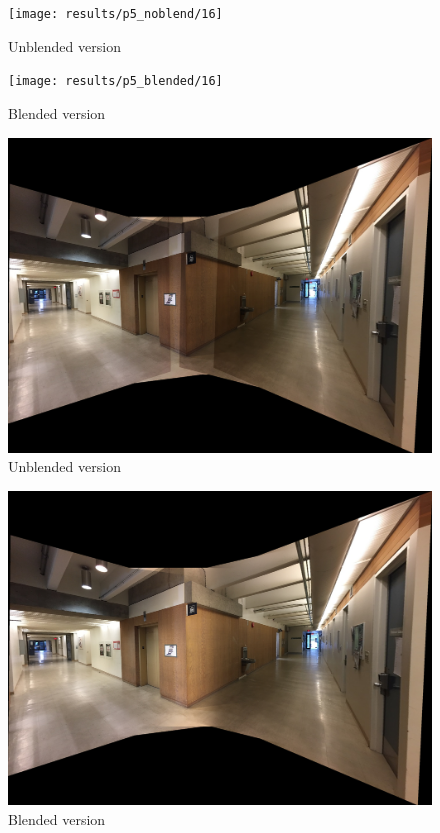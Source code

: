 \documentclass[]{article}
\begin{document}
\begin{figure}[!h]
	\texttt{[image: results/p5\_noblend/16]}
	\centering
	\caption{Unblended version}
\end{figure}
\vspace{300mm}
\begin{figure}[!h]
	\texttt{[image: results/p5\_blended/16]}
	\centering
	\caption{Blended version}
\end{figure}
\begin{figure}[!h]
	\includegraphics[scale=0.18]{results/p7_noblend/16}
	\centering
	\caption{Unblended version}
\end{figure}
\vspace{300mm}
\begin{figure}[!h]
	\includegraphics[scale=0.18]{results/p7_blend/16}
	\centering
	\caption{Blended version}
\end{figure}
\end{document}
